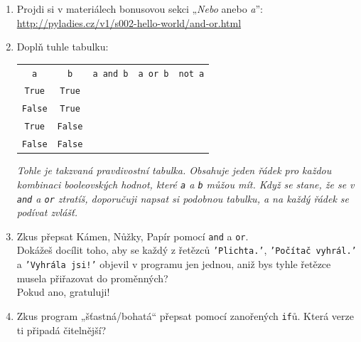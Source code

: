 \documentclass[a4paper,10pt]{article}
\newcommand\True{\texttt{True}}
\newcommand\False{\texttt{False}}
\begin{document}
\begin{enumerate}[resume]

\item Projdi si v materiálech bonusovou sekci „\emph{Nebo} anebo \emph{a}”:
    \\\url{http://pyladies.cz/v1/s002-hello-world/and-or.html}

\item Doplň tuhle tabulku:

    {
        \newcommand\rowend{\rule{0pt}{0.5cm}\\ \hline}
        \begin{tabular}{c|c||c|c|c}
        \arrayrulecolor{silver}
        \verb+a+ & \verb+b+ & \verb+a and b+ & \verb+a or b+ & \verb+not a+ \\
        \arrayrulecolor{black}\hline\arrayrulecolor{silver}
        \True & \True &  &  &  \rowend
        \False & \True &  &  &  \rowend
        \True & \False &  &  &  \rowend
        \False & \False &  &  &  \rowend
        \end{tabular}
    }

    \emph{\small Tohle je takzvaná \emph{pravdivostní tabulka}.
          Obsahuje jeden řádek pro každou kombinaci booleovských hodnot, které \texttt{a} a \texttt{b}
          můžou mít. Když se stane, že se v \texttt{and} a \texttt{or} ztratíš,
          doporučuji napsat si podobnou tabulku, a na každý řádek se podívat zvlášť.}

\item Zkus přepsat Kámen, Nůžky, Papír pomocí \texttt{and} a \texttt{or}.
    \\Dokážeš docílit toho, aby se každý z řetězců \texttt{'Plichta.'},
    \texttt{'Počítač vyhrál.'} a \texttt{'Vyhrála jsi!'} objevil v programu jen jednou,
    aniž bys tyhle řetězce musela přiřazovat do proměnných?
    \\Pokud ano, gratuluji!

\item Zkus program „šťastná/bohatá“ přepsat pomocí zanořených \texttt{if}ů. Která verze ti připadá čitelnější?

\end{enumerate}
\end{document}
